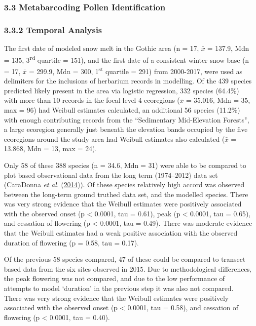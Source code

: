\documentclass[
]{article}
\begin{document}
\hypertarget{metabarcoding-pollen-identification}{%
\subsubsection{3.3 \textbar{} Metabarcoding Pollen
Identification}\label{metabarcoding-pollen-identification}}

\hypertarget{temporal-analysis}{%
\subsubsection{3.3.2 \textbar{} Temporal
Analysis}\label{temporal-analysis}}

The first date of modeled snow melt in the Gothic area (n = 17,
\(\bar{x}\) = 137.9, Mdn = 135, 3\textsuperscript{rd} quartile = 151),
and the first date of a consistent winter snow base (n = 17, \(\bar{x}\)
= 299.9, Mdn = 300, 1\textsuperscript{st} quartile = 291) from
2000-2017, were used as delimiters for the inclusions of herbarium
records in modelling. Of the 439 species predicted likely present in the
area via logistic regression, 332 species (64.4\%) with more than 10
records in the focal level 4 ecoregions (\(\bar{x}\) = 35.016, Mdn = 35,
max = 96) had Weibull estimates calculated, an additional 56 species
(11.2\%) with enough contributing records from the ``Sedimentary
Mid-Elevation Forests'', a large ecoregion generally just beneath the
elevation bands occupied by the five ecoregions around the study area
had Weibull estimates also calculated (\(\bar{x}\) = 13.868, Mdn = 13,
max = 24).

Only 58 of these 388 species (n = 34.6, Mdn = 31) were able to be
compared to plot based observational data from the long term
(1974--2012) data set (CaraDonna \emph{et al.}
(\protect\hyperlink{ref-caradonna2014shifts}{2014})). Of these species
relatively high accord was observed between the long-term ground truthed
data set, and the modelled species. There was very strong evidence that
the Weibull estimates were positively associated with the observed onset
(p \textless{} 0.0001, tau = 0.61), peak (p \textless{} 0.0001, tau =
0.65), and cessation of flowering (p \textless{} 0.0001, tau = 0.49).
There was moderate evidence that the Weibull estimates had a weak
positive association with the observed duration of flowering (p = 0.58,
tau = 0.17).

Of the previous 58 species compared, 47 of these could be compared to
transect based data from the six sites observed in 2015. Due to
methodological differences, the peak flowering was not compared, and due
to the low performance of attempts to model `duration' in the previous
step it was also not compared. There was very strong evidence that the
Weibull estimates were positively associated with the observed onset (p
\textless{} 0.0001, tau = 0.58), and cessation of flowering (p
\textless{} 0.0001, tau = 0.40).
\end{document}
